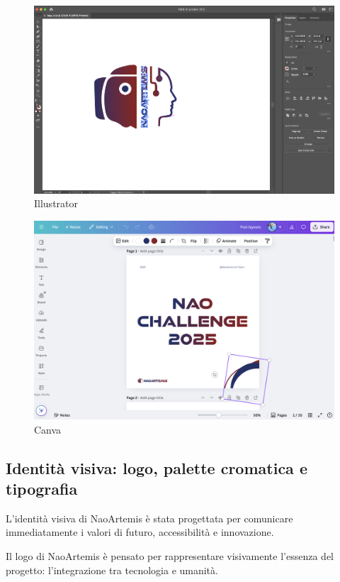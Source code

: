 \documentclass{optica-article}
\begin{document}
\begin{figure}[h]
  \centering
  \includegraphics[width=\textwidth]{figures/illustrator.png}
  \caption{Illustrator}
  \label{fig:py3_01}
\end{figure}

\begin{figure}[H]
  \centering
  \includegraphics[width=\textwidth]{figures/canva.png}
  \caption{Canva}
  \label{fig:py3_01}
\end{figure}


\subsection{Identit\`a visiva: logo, palette cromatica e tipografia}
L’identit\`a visiva di NaoArtemis \`e stata progettata per comunicare immediatamente i valori di futuro, accessibilit\`a e innovazione.

Il logo di NaoArtemis \`e pensato per rappresentare visivamente l’essenza del progetto: l’integrazione tra tecnologia e umanit\`a.
\end{document}
